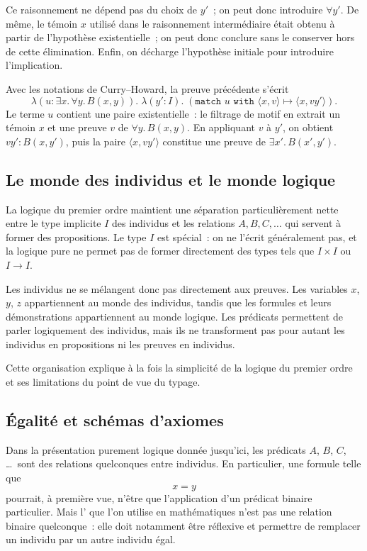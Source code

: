 Ce raisonnement ne dépend pas du choix de $y'$ ; on peut donc introduire
$\forall y'$.  De même, le témoin $x$ utilisé dans le raisonnement
intermédiaire était obtenu à partir de l'hypothèse existentielle ; on
peut donc conclure sans le conserver hors de cette élimination.  Enfin,
on décharge l'hypothèse initiale pour introduire l'implication.

\thingy
Avec les notations de Curry--Howard, la preuve précédente s'écrit
\[
\lambda(u:\exists x.\,\forall y.\,B(x,y)).\;
\lambda(y':I).\;
(\texttt{match~}u\texttt{~with~}\langle x,v\rangle\mapsto
\langle x,vy'\rangle).
\]
Le terme $u$ contient une paire existentielle : le filtrage de motif en
extrait un témoin $x$ et une preuve $v$ de $\forall y.\,B(x,y)$.  En
appliquant $v$ à $y'$, on obtient $vy':B(x,y')$, puis la paire
$\langle x,vy'\rangle$ constitue une preuve de
$\exists x'.\,B(x',y')$.

\subsection{Le monde des individus et le monde logique}

\thingy
La logique du premier ordre maintient une séparation particulièrement
nette entre le type implicite $I$ des individus et les relations
$A,B,C,\ldots$ qui servent à former des propositions.  Le type $I$ est
spécial : on ne l'écrit généralement pas, et la logique pure ne permet
pas de former directement des types tels que $I\times I$ ou $I\to I$.

\thingy
Les individus ne se mélangent donc pas directement aux preuves.  Les
variables $x$, $y$, $z$ appartiennent au monde des individus, tandis
que les formules et leurs démonstrations appartiennent au monde
logique.  Les prédicats permettent de parler logiquement des individus,
mais ils ne transforment pas pour autant les individus en propositions
ni les preuves en individus.

Cette organisation explique à la fois la simplicité de la logique du
premier ordre et ses limitations du point de vue du typage.

\subsection{Égalité et schémas d'axiomes}

\thingy
Dans la présentation purement logique donnée jusqu'ici, les prédicats
$A$, $B$, $C$, \ldots\ sont des relations quelconques entre individus.
En particulier, une formule telle que
\[
x=y
\]
pourrait, à première vue, n'être que l'application d'un prédicat binaire
particulier.  Mais l' que l'on utilise en mathématiques
n'est pas une relation binaire quelconque : elle doit notamment être
réflexive et permettre de remplacer un individu par un autre individu
égal.


